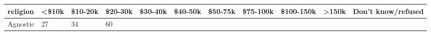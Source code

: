 \documentclass[]{article}
\begin{document}
\begin{longtable}[]{@{}lllllllllll@{}}
\toprule
\begin{minipage}[b]{0.14\columnwidth}\raggedright
religion\strut
\end{minipage} & \begin{minipage}[b]{0.04\columnwidth}\raggedright
\textless{}\$10k\strut
\end{minipage} & \begin{minipage}[b]{0.05\columnwidth}\raggedright
\$10-20k\strut
\end{minipage} & \begin{minipage}[b]{0.05\columnwidth}\raggedright
\$20-30k\strut
\end{minipage} & \begin{minipage}[b]{0.05\columnwidth}\raggedright
\$30-40k\strut
\end{minipage} & \begin{minipage}[b]{0.05\columnwidth}\raggedright
\$40-50k\strut
\end{minipage} & \begin{minipage}[b]{0.05\columnwidth}\raggedright
\$50-75k\strut
\end{minipage} & \begin{minipage}[b]{0.06\columnwidth}\raggedright
\$75-100k\strut
\end{minipage} & \begin{minipage}[b]{0.06\columnwidth}\raggedright
\$100-150k\strut
\end{minipage} & \begin{minipage}[b]{0.04\columnwidth}\raggedright
\textgreater{}150k\strut
\end{minipage} & \begin{minipage}[b]{0.11\columnwidth}\raggedright
Don't know/refused\strut
\end{minipage}\tabularnewline
\midrule
\endhead
\begin{minipage}[t]{0.14\columnwidth}\raggedright
Agnostic\strut
\end{minipage} & \begin{minipage}[t]{0.04\columnwidth}\raggedright
27\strut
\end{minipage} & \begin{minipage}[t]{0.05\columnwidth}\raggedright
34\strut
\end{minipage} & \begin{minipage}[t]{0.05\columnwidth}\raggedright
60\strut
\end{minipage} & \begin{minipage}[t]{0.05\columnwidth}\raggedright

\end{minipage}
\end{longtable}
\end{document}

